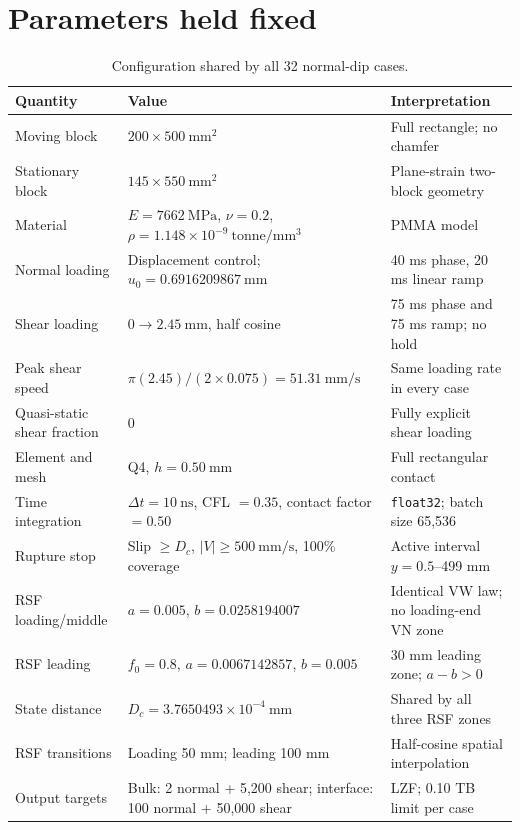 \documentclass[11pt]{article}
\begin{document}
\section{Parameters held fixed}

\begin{table}[htbp]
  \centering
  \footnotesize
  \caption{Configuration shared by all 32 normal-dip cases.}
  \label{tab:fixed}
  \begin{tabular}{@{}L{5.0cm}L{5.3cm}L{4.0cm}@{}}
    \toprule
    Quantity & Value & Interpretation \\
    \midrule
    Moving block & $200\times500\ \mathrm{mm^2}$ & Full rectangle; no chamfer \\
    Stationary block & $145\times550\ \mathrm{mm^2}$ & Plane-strain two-block geometry \\
    Material & $E=7662\ \mathrm{MPa}$, $\nu=0.2$, $\rho=1.148\times10^{-9}\ \mathrm{tonne/mm^3}$ & PMMA model \\
    Normal loading & Displacement control; $u_0=0.6916209867\ \mathrm{mm}$ & 40 ms phase, 20 ms linear ramp \\
    Shear loading & $0\rightarrow2.45\ \mathrm{mm}$, half cosine & 75 ms phase and 75 ms ramp; no hold \\
    Peak shear speed & $\pi(2.45)/(2\times0.075)=51.31\ \mathrm{mm/s}$ & Same loading rate in every case \\
    Quasi-static shear fraction & 0 & Fully explicit shear loading \\
    Element and mesh & Q4, $h=0.50\ \mathrm{mm}$ & Full rectangular contact \\
    Time integration & $\Delta t=10\ \mathrm{ns}$, CFL $=0.35$, contact factor $=0.50$ & \texttt{float32}; batch size 65,536 \\
    Rupture stop & Slip $\geq D_c$, $|V|\geq500\ \mathrm{mm/s}$, 100\% coverage & Active interval $y=0.5$--499 mm \\
    RSF loading/middle & $a=0.005$, $b=0.0258194007$ & Identical VW law; no loading-end VN zone \\
    RSF leading & $f_0=0.8$, $a=0.0067142857$, $b=0.005$ & 30 mm leading zone; $a-b>0$ \\
    State distance & $D_c=3.7650493\times10^{-4}\ \mathrm{mm}$ & Shared by all three RSF zones \\
    RSF transitions & Loading 50 mm; leading 100 mm & Half-cosine spatial interpolation \\
    Output targets & Bulk: 2 normal + 5,200 shear; interface: 100 normal + 50,000 shear & LZF; 0.10 TB limit per case \\
    \bottomrule
  \end{tabular}
\end{table}
\end{document}
